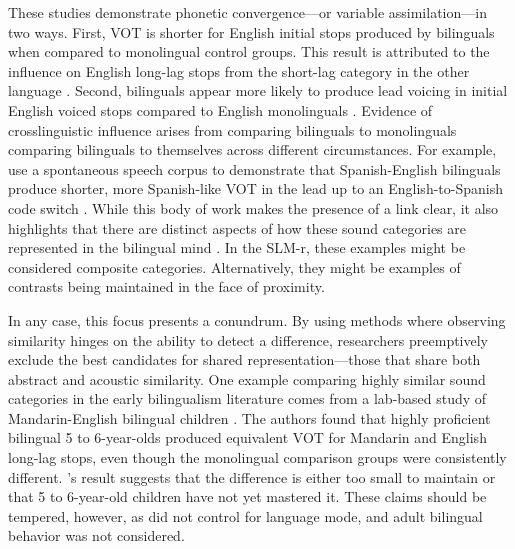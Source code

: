 These studies demonstrate phonetic convergence---or variable assimilation---in two ways. First, VOT is shorter for English initial stops produced by bilinguals when compared to monolingual control groups. This result is attributed to the influence on English long-lag stops from the short-lag category in the other language \citep{olson_2016_transfer}. Second, bilinguals appear more likely to produce lead voicing in initial English voiced stops compared to English monolinguals \citep{sundara_2006_production}. Evidence of crosslinguistic influence arises from comparing bilinguals to monolinguals comparing bilinguals to themselves across different circumstances. For example, \citet{fricke_2016_phonetic} use a spontaneous speech corpus to demonstrate that Spanish-English bilinguals produce shorter, more Spanish-like VOT in the lead up to an English-to-Spanish code switch \citep{fricke_2016_phonetic}. While this body of work makes the presence of a link clear, it also highlights that there are distinct aspects of how these sound categories are represented in the bilingual mind \citep{casillas_2021_interlingual}. In the SLM-r, these examples might be considered composite categories. Alternatively, they might be examples of contrasts being maintained in the face of proximity.

In any case, this focus presents a conundrum. By using methods where observing similarity hinges on the ability to detect a difference, researchers preemptively exclude the best candidates for shared representation---those that share both abstract and acoustic similarity. One example comparing highly similar sound categories in the early bilingualism literature comes from a lab-based study of Mandarin-English bilingual children \citep{yang_2019_vot}. The authors found that highly proficient bilingual 5 to 6-year-olds produced equivalent VOT for Mandarin and English long-lag stops, even though the monolingual comparison groups were consistently different. \citeauthor{yang_2019_vot}'s result suggests that the difference is either too small to maintain or that 5 to 6-year-old children have not yet mastered it. These claims should be tempered, however, as \citet{yang_2019_vot} did not control for language mode, and adult bilingual behavior was not considered. 

